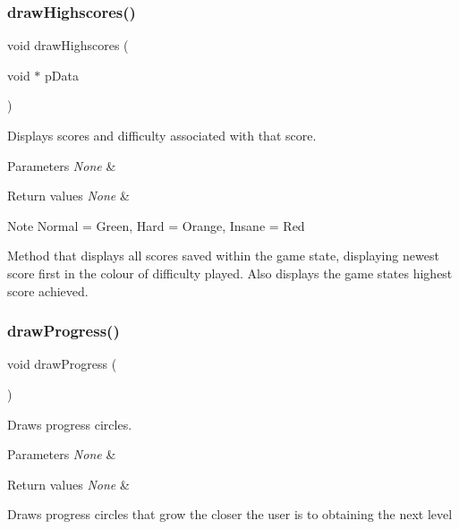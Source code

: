 \subsubsection{\texorpdfstring{draw\+Highscores()}{drawHighscores()}}
{\footnotesize\ttfamily void draw\+Highscores (\begin{DoxyParamCaption}\item[{void $\ast$}]{p\+Data }\end{DoxyParamCaption})}



Displays scores and difficulty associated with that score. 


\begin{DoxyParams}{Parameters}
{\em None} & \\
\hline
\end{DoxyParams}

\begin{DoxyRetVals}{Return values}
{\em None} & \\
\hline
\end{DoxyRetVals}
\begin{DoxyNote}{Note}
Normal = Green, Hard = Orange, Insane = Red
\end{DoxyNote}
Method that displays all scores saved within the game state, displaying newest score first in the colour of difficulty played. Also displays the game states highest score achieved. \mbox{\label{group___flappy___bird_gac05c4ab9e73e7da3aba0176b07d2be38}} 
\subsubsection{\texorpdfstring{draw\+Progress()}{drawProgress()}}
{\footnotesize\ttfamily void draw\+Progress (\begin{DoxyParamCaption}{ }\end{DoxyParamCaption})}



Draws progress circles. 


\begin{DoxyParams}{Parameters}
{\em None} & \\
\hline
\end{DoxyParams}

\begin{DoxyRetVals}{Return values}
{\em None} & \\
\hline
\end{DoxyRetVals}
Draws progress circles that grow the closer the user is to obtaining the next level \mbox{\label{group___flappy___bird_gacd19dd68085054a6f6fdf8b4ac664255}} 
